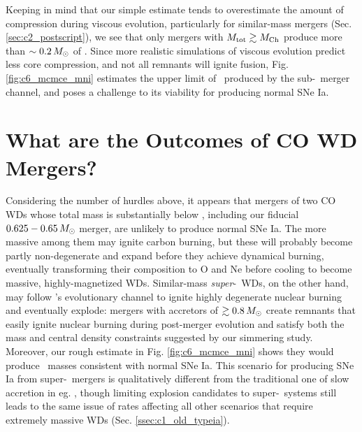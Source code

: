 Keeping in mind that our simple estimate tends to overestimate the amount of compression during viscous evolution, particularly for similar-mass mergers (Sec. \ref{sec:c2_postscript}), we see that only mergers with $\Mtot \gtrsim \Mch$ produce more than $\sim0.2\,\Msun$ of \Ni.  Since more realistic simulations of viscous evolution predict less core compression, and not all remnants will ignite fusion, Fig. \ref{fig:c6_mcmce_mni} estimates the upper limit of \Ni\ produced by the sub-\Mch\ merger channel, and poses a challenge to its viability for producing normal SNe Ia.

\section{What are the Outcomes of CO WD Mergers?}

Considering the number of hurdles above, it appears that mergers of two CO WDs whose total mass is substantially below \Mch, including our fiducial $0.625 - 0.65\,\Msun$ merger, are unlikely to produce normal SNe Ia.  The more massive among them may ignite carbon burning, but these will probably become partly non-degenerate and expand before they achieve dynamical burning, eventually transforming their composition to O and Ne before cooling to become massive, highly-magnetized WDs.  Similar-mass \textit{super}-\Mch\ WDs, on the other hand, may follow \citeal{vkercj10}'s evolutionary channel to ignite highly degenerate nuclear burning and eventually explode: mergers with accretors of $\gtrsim0.8\,\Msun$ create remnants that easily ignite nuclear burning during post-merger evolution and satisfy both the mass and central density constraints suggested by our simmering study.  Moreover, our rough estimate in Fig. \ref{fig:c6_mcmce_mni} shows they would produce \Ni\ masses consistent with normal SNe Ia.  This scenario for producing SNe Ia from super-\Mch\ mergers is qualitatively different from the traditional one of slow accretion in eg. \cite{yoonpr07}, though limiting explosion candidates to super-\Mch\ systems still leads to the same issue of rates affecting all other scenarios that require extremely massive WDs (Sec. \ref{ssec:c1_old_typeia}).


